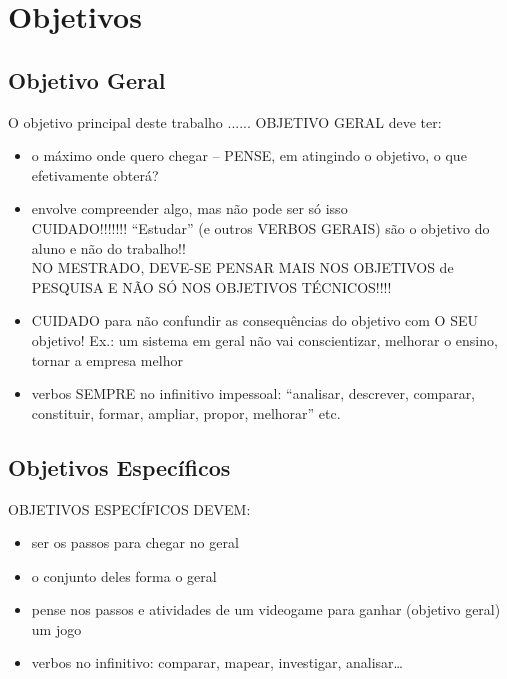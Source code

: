 

\section{Objetivos}
\label{sec:objetivo}

\subsection{Objetivo Geral}
\label{sec:objgeral}

O objetivo principal deste trabalho ......
OBJETIVO GERAL deve ter:
\begin{itemize}
  \item o máximo onde quero chegar – PENSE, em atingindo o objetivo, o que efetivamente obterá?
  \item envolve compreender algo, mas não pode ser só isso\\
        CUIDADO!!!!!!! “Estudar” (e outros VERBOS GERAIS) são o objetivo do aluno e não do trabalho!!\\
        NO MESTRADO, DEVE-SE PENSAR MAIS NOS OBJETIVOS de PESQUISA E NÃO SÓ NOS OBJETIVOS TÉCNICOS!!!!
  \item CUIDADO para não confundir as consequências do objetivo com O SEU objetivo!
        Ex.: um sistema em geral não vai conscientizar, melhorar o ensino, tornar a empresa melhor
  \item verbos SEMPRE no infinitivo impessoal:
        “analisar, descrever, comparar, constituir, formar, ampliar, propor, melhorar” etc.
\end{itemize}


\subsection{Objetivos Específicos}
\label{sec:objespecificos}

OBJETIVOS ESPECÍFICOS DEVEM:
\begin{itemize}
  \item ser os passos para chegar no geral
  \item o conjunto deles forma o geral
  \item pense nos passos e atividades de um videogame para ganhar (objetivo geral) um jogo
  \item verbos no infinitivo: comparar, mapear, investigar, analisar…
\end{itemize}



